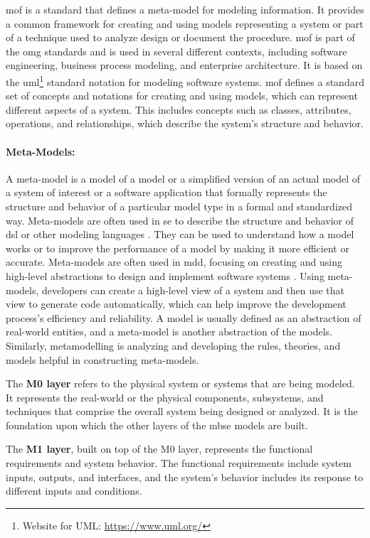 \ac{mof} is a standard that defines a meta-model for modeling information. 
It provides a common framework for creating and using models representing a system or part of a technique used to analyze design or document the procedure.
\ac{mof} is part of the \ac{omg} \cite{misc:mbse:mof} standards and is used in several different contexts, including software engineering, business process modeling, and enterprise architecture. 
It is based on the \ac{uml}\footnote{Website for UML: \url{https://www.uml.org/}} standard notation for modeling software systems.
\ac{mof} defines a standard set of concepts and notations for creating and using models, which can represent different aspects of a system. 
This includes concepts such as classes, attributes, operations, and relationships, which describe the system's structure and behavior.

\paragraph{Meta-Models:} 
A meta-model is a model of a model or a simplified version of an actual model of a system of interest or a software application that formally represents the structure and behavior of a particular model type in a formal and standardized way.
Meta-models are often used in \ac{se} to describe the structure and behavior of \ac{dsl} or other modeling languages \cite{misc:metamodels:dsl}.
They can be used to understand how a model works or to improve the performance of a model by making it more efficient or accurate. 
Meta-models are often used in \ac{mdd}, focusing on creating and using high-level abstractions to design and implement software systems \cite{misc:metamodels:mdd}. 
Using meta-models, developers can create a high-level view of a system and then use that view to generate code automatically, which can help improve the development process's efficiency and reliability.
A model is usually defined as an abstraction of real-world entities, and a meta-model is another abstraction of the models. 
Similarly, metamodelling is analyzing and developing the rules, theories, and models helpful in constructing meta-models.

The \textbf{M0 layer} refers to the physical system or systems that are being modeled. 
It represents the real-world or the physical components, subsystems, and techniques that comprise the overall system being designed or analyzed. 
It is the foundation upon which the other layers of the \ac{mbse} models are built.

The \textbf{M1 layer}, built on top of the M0 layer, represents the functional requirements and system behavior.
The functional requirements include system inputs, outputs, and interfaces, and the system's behavior includes its response to different inputs and conditions.

